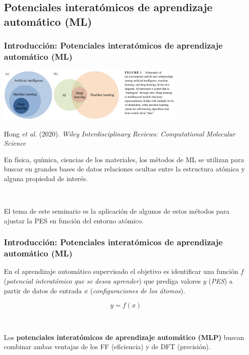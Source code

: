 \documentclass[aspectratio=169]{beamer}
\let\oldtextbf\textbf
\renewcommand{\textbf}[1]{\textcolor{nordblue}{\oldtextbf{#1}}}
\begin{document}
    \subsection{Potenciales interatómicos de aprendizaje automático (ML)}
    
    \begin{frame}
        \frametitle{Introducción: Potenciales interatómicos de aprendizaje 
        automático (ML)}

        \begin{center}
            \includegraphics[width=0.7\textwidth]{intro-definicion-ML.png}

            \tiny{Hong \textit{et al.} (2020). \textit{Wiley Interdisciplinary
            Reviews: Computational Molecular Science}}
        \end{center}

        \pause
    
        En física, química, ciencias de los materiales, los métodos de ML se
        utilizan para buscar en grandes bases de datos relaciones ocultas entre 
        la estructura atómica y alguna propiedad de interés.

        \ \pause

        El tema de este seminario es la aplicación de algunos de estos métodos
        para ajustar la PES en función del entorno atómico.

	\end{frame}
	
    \begin{frame}
        \frametitle{Introducción: Potenciales interatómicos de aprendizaje 
        automático (ML)}

        En el aprendizaje automático supervisado el objetivo es identificar una
        función $f$ (\textit{potencial interatómico que se desea aprender}) que
        prediga valores $y$ (\textit{PES}) a partir de datos de entrada $x$ 
        (\textit{configuraciones de los átomos}).
        
        $$
        y = f(x)
        $$

        \ \pause
        
        Los \textbf{potenciales interatómicos de aprendizaje automático (MLP)} 
        buscan combinar ambas ventajas de los FF (eficiencia) y de DFT 
        (precisión).

	\end{frame}
    
\end{document}
